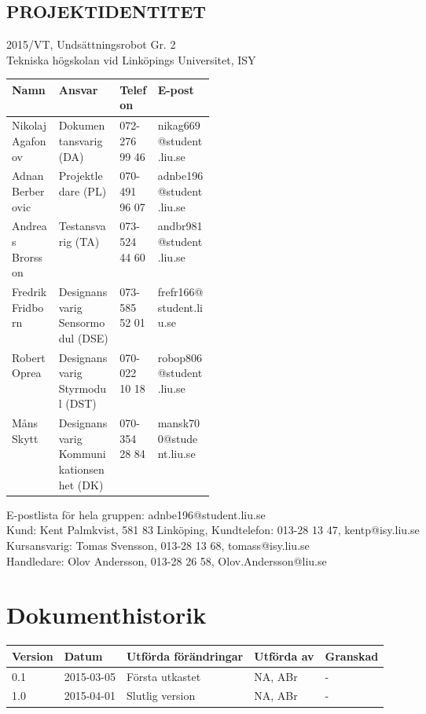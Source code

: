 \documentclass[11pt]{article}
\begin{document}
\pagebreak
\begin{center}

\section*{PROJEKTIDENTITET}
2015/VT, Undsättningsrobot Gr. 2
\\
Tekniska högskolan vid Linköpings Universitet, ISY
\\[0.5in]
\begin{table}[h]
\begin{tabular}{|l|p{0.3\linewidth}|l|l|} \hline
Namn & Ansvar & Telefon & E-post \\[0.1in] \hline
Nikolaj Agafonov & Dokumentansvarig (DA) & 072-276 99 46 & nikag669@student.liu.se \\ \hline
Adnan Berberovic & Projektledare (PL) & 070-491 96 07 & adnbe196@student.liu.se \\ \hline
Andreas Brorsson & Testansvarig (TA) & 073-524 44 60 & andbr981@student.liu.se \\ \hline
Fredrik Fridborn & Designansvarig Sensormodul (DSE) & 073-585 52 01 & frefr166@student.liu.se \\ \hline
Robert Oprea & Designansvarig Styrmodul (DST) & 070-022 10 18 & robop806@student.liu.se \\ \hline
Måns Skytt & Designansvarig Kommunikationsenhet (DK) & 070-354 28 84 & mansk700@student.liu.se \\ \hline
\end{tabular}
\end{table}


E-postlista för hela gruppen: adnbe196@student.liu.se
\\[1in]
Kund: Kent Palmkvist, 581 83 Linköping,
Kundtelefon: 013-28 13 47, kentp@isy.liu.se
\\[1in]

Kursansvarig: Tomas Svensson, 013-28 13 68, tomass@isy.liu.se
\\
Handledare: Olov Andersson, 013-28 26 58, Olov.Andersson@liu.se
\end{center}
\pagebreak

\tableofcontents

\pagebreak

\section*{Dokumenthistorik}
\begin{table}[h]
\begin{tabular}{|l|l|l|l|l|} \hline

Version & Datum & Utförda förändringar & Utförda av & Granskad \\[0.1in] \hline
0.1 & 2015-03-05 & Första utkastet & NA, ABr & - \\ \hline
1.0 & 2015-04-01 & Slutlig version & NA, ABr & - \\ \hline


\end{tabular}
\end{table}
\end{document}
